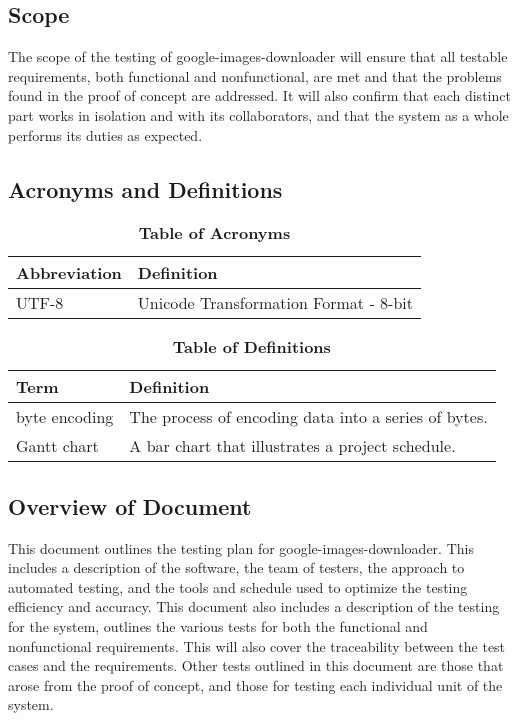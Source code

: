 \documentclass[12pt, titlepage]{article}
\begin{document}
\subsection{Scope}
The scope of the testing of google-images-downloader will ensure that all testable requirements, both functional and nonfunctional, are met and that the problems found in the proof of concept are addressed. It will also confirm that each distinct part works in isolation and with its collaborators, and that the system as a whole performs its duties as expected.

\subsection{Acronyms and Definitions}
	
\begin{table}[hbp]
\label{TableOfAbbr}

\begin{tabularx}{\textwidth}{p{3cm}X}
\toprule
\textbf{Abbreviation} & \textbf{Definition} \\
\midrule
UTF-8 & Unicode Transformation Format - 8-bit\\
\bottomrule
\end{tabularx}
\caption{\textbf{Table of Acronyms}} 

\end{table}

\begin{table}[!htbp]
\label{TableOfDef}

\begin{tabularx}{\textwidth}{p{3cm}X}
\toprule
\textbf{Term} & \textbf{Definition}\\
\midrule
byte encoding & The process of encoding data into a series of bytes.\\
Gantt chart & A bar chart that illustrates a project schedule.\\
\bottomrule
\end{tabularx}
\caption{\textbf{Table of Definitions}} 

\end{table}	

\subsection{Overview of Document}

This document outlines the testing plan for google-images-downloader. This includes a description of the software, the team of testers, the approach to automated testing, and the tools and schedule used to optimize the testing efficiency and accuracy. This document also includes a description of the testing for the system, outlines the various tests for both the functional and nonfunctional requirements. This will also cover the traceability between the test cases and the requirements. Other tests outlined in this document are those that arose from the proof of concept, and those for testing each individual unit of the system.
\end{document}
